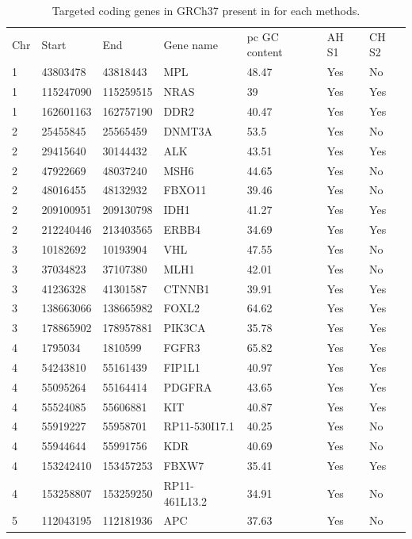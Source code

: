 \documentclass{article}
\begin{document}
\begin{center}
\begin{longtable}{ l l l l l l l}
\caption{Targeted coding genes in GRCh37 present in for each methods. \label{long}}\\
%
 \hline  
Chr & Start & End & Gene name & pc GC content & AH S1 & CH S2 \\
1 & 43803478 & 43818443 & MPL & 48.47 & Yes & No \\
1 & 115247090 & 115259515 & NRAS & 39 & Yes & Yes \\
1 & 162601163 & 162757190 & DDR2 & 40.47 & Yes & Yes \\
2 & 25455845 & 25565459 & DNMT3A & 53.5 & Yes & No \\
2 & 29415640 & 30144432 & ALK & 43.51 & Yes & Yes \\
2 & 47922669 & 48037240 & MSH6 & 44.65 & Yes & No \\
2 & 48016455 & 48132932 & FBXO11 & 39.46 & Yes & No \\
2 & 209100951 & 209130798 & IDH1 & 41.27 & Yes & Yes \\
2 & 212240446 & 213403565 & ERBB4 & 34.69 & Yes & Yes \\
3 & 10182692 & 10193904 & VHL & 47.55 & Yes & No \\
3 & 37034823 & 37107380 & MLH1 & 42.01 & Yes & No \\
3 & 41236328 & 41301587 & CTNNB1 & 39.91 & Yes & Yes \\
3 & 138663066 & 138665982 & FOXL2 & 64.62 & Yes & Yes \\
3 & 178865902 & 178957881 & PIK3CA & 35.78 & Yes & Yes \\
4 & 1795034 & 1810599 & FGFR3 & 65.82 & Yes & Yes \\
4 & 54243810 & 55161439 & FIP1L1 & 40.97 & Yes & Yes \\
4 & 55095264 & 55164414 & PDGFRA & 43.65 & Yes & Yes \\
4 & 55524085 & 55606881 & KIT & 40.87 & Yes & Yes \\
4 & 55919227 & 55958701 & RP11-530I17.1 & 40.25 & Yes & No \\
4 & 55944644 & 55991756 & KDR & 40.69 & Yes & No \\
4 & 153242410 & 153457253 & FBXW7 & 35.41 & Yes & Yes \\
4 & 153258807 & 153259250 & RP11-461L13.2 & 34.91 & Yes & No \\
5 & 112043195 & 112181936 & APC & 37.63 & Yes & No \\

\end{longtable}
\end{center}
\end{document}
